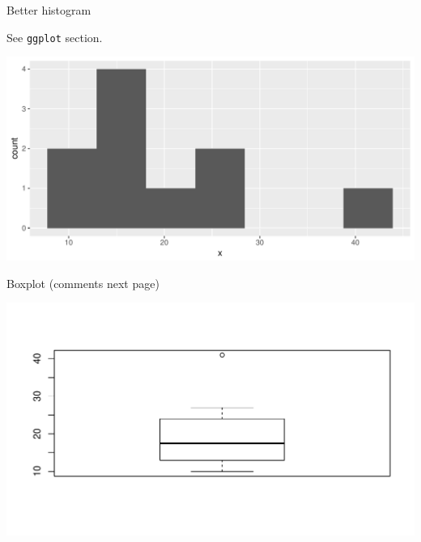 \begin{frame}[fragile]{Better histogram}

  See \texttt{ggplot} section.
  
\begin{knitrout}
\color{fgcolor}\begin{kframe}
\begin{alltt}
\hlkwb{=}
\hlopt{+}\hlstd{(}\hlstd{=}\hlstd{)}
\end{alltt}
\end{kframe}
\includegraphics[width=\maxwidth]{figure/binsg-1} 

\end{knitrout}
  
\end{frame}

\begin{frame}[fragile]{Boxplot (comments next page)}
  
 
\begin{knitrout}
\color{fgcolor}\begin{kframe}
\begin{alltt}
\end{alltt}
\end{kframe}
\includegraphics[width=\maxwidth]{figure/aslkhrliuf-1} 

\end{knitrout}
   
  
\end{frame}

